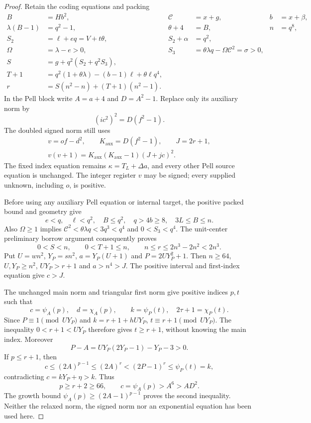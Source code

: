 \begin{proof}
Retain the coding equations and packing
\begin{align*}
 B&=Hb^2,&\mathcal C&=x+g,&b&=x+\beta,\\
 \lambda(B-1)&=q^2-1,&\theta+4&=B,&n&=q^8,\\
 S_2&=\ell+eq=V+t\theta,&S_2+\alpha&=q^2,\\
 \Omega&=\lambda-e>0,&
 S_3&=\theta\lambda q-\Omega\mathcal C^2=\sigma>0,\\
 S&=g+q^2(S_2+q^2S_3),\\
 T+1&=q^2(1+\theta\lambda)-(b-1)\ell+\theta\ell q^4,\\
 r&=S(n^2-n)+(T+1)(n^2-1).
\end{align*}
In the Pell block write $A=a+4$ and $D=A^2-1$. Replace only its
auxiliary norm by
\begin{equation}\label{eq:composed97-auxiliary}
 (ic^2)^2=D(f^2-1).
\end{equation}
The doubled signed norm still uses
\begin{equation}\label{eq:composed97-signed}
 \begin{gathered}
 v=of-d^2,\qquad K_{\mathrm{aux}}=D(f^2-1),\qquad J=2r+1,\\
 v(v+1)=K_{\mathrm{aux}}(K_{\mathrm{aux}}-1)(J+jc)^2.
 \end{gathered}
\end{equation}
The fixed index equation remains $\kappa=T_L+\Delta a$, and every
other Pell source equation is unchanged. The integer register $v$
may be signed; every supplied unknown, including $o$, is positive.

Before using any auxiliary Pell equation or internal target,
the positive packed bound and geometry give
\[
 e<q,\quad\ell<q^2,\quad B\le q^2,\quad
 q>4b\ge8,\quad3L\le B\le n.
\]
Also $\Omega\ge1$ implies
$\mathcal C^2<\theta\lambda q<3q^3<q^4$ and $0<S_3<q^4$.
The unit-center preliminary borrow argument consequently proves
\begin{equation}\label{eq:composed97-ranges}
 0<S<n,\qquad0<T+1\le n,\qquad
 n\le r\le2n^3-2n^2<2n^3.
\end{equation}
Put $U=wn^2$, $Y_P=sn^2$, $a=Y_P(U+1)$ and $P=2UY_P^2+1$.
Then $n\ge64$, $U,Y_P\ge n^2$, $UY_P>r+1$ and $a>n^4>J$.
The positive interval and first-index equation give $c>J$.

The unchanged main norm and triangular first norm give positive
indices $p,t$ such that
\[
 c=\psi_A(p),\quad d=\chi_A(p),\qquad
 k=\psi_P(t),\quad2\tau+1=\chi_P(t).
\]
Since $P\equiv1\pmod{UY_P}$ and $k=r+1+hUY_P$,
$t\equiv r+1\pmod{UY_P}$. The inequality $0<r+1<UY_P$ therefore
gives $t\ge r+1$, without knowing the main index.
Moreover
\[
 P-A=UY_P(2Y_P-1)-Y_P-3>0.
\]
If $p\le r+1$, then
\[
 c\le(2A)^{p-1}\le(2A)^r
   <(2P-1)^r\le\psi_P(t)=k,
\]
contradicting $c=kY_P+\eta>k$. Thus
\begin{equation}\label{eq:composed97-large-main-index}
 p\ge r+2\ge66,
 \qquad c=\psi_A(p)>A^6>A D^2.
\end{equation}
The growth bound $\psi_A(p)\ge(2A-1)^{p-1}$ proves the second
inequality. Neither the relaxed norm, the signed norm nor an
exponential equation has been used here.


\end{proof}
